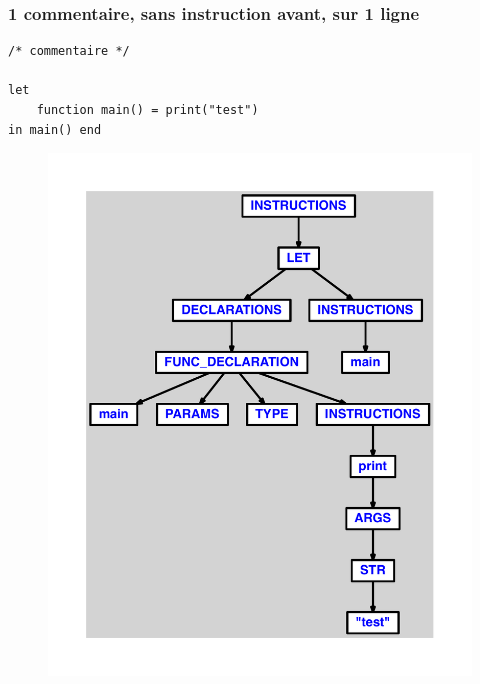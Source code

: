 \documentclass{article}
\begin{document}
\subsubsection{1 commentaire, sans instruction avant, sur 1 ligne}
\begin{lstlisting}
/* commentaire */

let
	function main() = print("test")
in main() end
\end{lstlisting}
\newpage
\begin{figure}[H]
\centering
\includegraphics[max width=\textwidth]{ast/ast_150.pdf}
\end{figure}
\newpage
\end{document}
